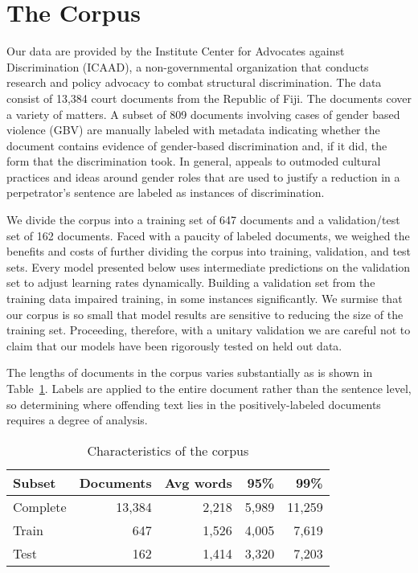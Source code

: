 \documentclass[twocolumn,10pt]{wmrDoc}
\begin{document}
\section{The Corpus}
Our data are provided by the Institute Center for Advocates against Discrimination (ICAAD), a non-governmental organization that conducts research and policy advocacy to combat structural
discrimination. The data consist of 13,384 court documents from the Republic of Fiji. The documents cover a variety of matters. A subset of 809 documents involving cases of gender based violence (GBV) are manually labeled with metadata indicating whether the document contains evidence of gender-based discrimination and, if it did, the form that the discrimination took. In general, appeals to outmoded cultural practices and ideas around gender roles that are used to justify a reduction in a perpetrator’s sentence are labeled as instances of discrimination.

We divide the corpus into a training set of 647 documents and a validation/test set of 162 documents.  Faced with a paucity of labeled documents, we weighed the benefits and costs of further dividing the corpus into training, validation, and test sets.  Every model presented below uses intermediate predictions on the validation set to adjust learning rates dynamically.  Building a validation set from the training data impaired training, in some instances significantly.  We surmise that our corpus is so small that model results are sensitive to reducing the size of the training set.  Proceeding, therefore, with a unitary validation we are careful not to claim that our models have been rigorously tested on held out data.

The lengths of documents in the corpus varies substantially as is shown in Table~\ref{tab:corpus}. Labels are applied to the entire document rather than the sentence level, so determining where offending text lies in the positively-labeled documents requires a degree of analysis.

\begin{table}
 \caption{Characteristics of the corpus}
  \centering
  \begin{tabular}{lrrrr}
    \toprule
    Subset   & Documents  & Avg words & 95\% & 99\%\\
    \midrule
    Complete & 13,384  & 2,218 & 5,989 & 11,259     \\
    Train    & 647  & 1,526 & 4,005 & 7,619      \\
    Test     & 162  & 1,414 & 3,320 & 7,203      \\
    \bottomrule
  \end{tabular}
  \label{tab:corpus}
\end{table}
\end{document}
